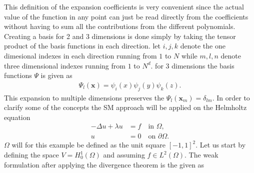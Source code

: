This definition of the expansion coefficients is very convenient since the actual value of 
the function in any point can just be read directly from the coefficients without having to 
sum all the contributions from the different polynomials.
Creating a basis for 2 and 3 dimensions is done simply by taking the tensor product 
of the basis functions in each direction. let $i,j,k$ denote the one dimesional indexes in each direction running from 
$1$ to $N$ while $m,l,n$ denote three dimensional indexes running from $1$ to $N^d$. 
for 3 dimensions the basis functions $\Psi$ is given as 
\begin{align}
    \Psi_{l}(\mathbf{x}) = \psi_i(x)\psi_j(y)\psi_k(z).
    \label{eq:3dbasis}
\end{align}
This expansion to multiple dimensions preserves the $\Psi_l(\mathbf{x}_m) = \delta_{lm}$.
In order to clarify some of the concepts the SM approach will be applied on the Helmholtz equation
%
\begin{align}
    -\Delta u + \lambda u &= f \quad \text{in } \Omega, \\
    u &= 0 \quad \text{on } \partial \Omega.
    \label{eq:Helmholtz}
\end{align}
%
$\Omega$ will for this example be defined as the unit square $[-1,1]^2$. 
Let us start by defining the space $V =H^1_0(\Omega)$ and assuming $f\in L^2(\Omega)$. The weak formulation after applying the divergence theorem is the given as

